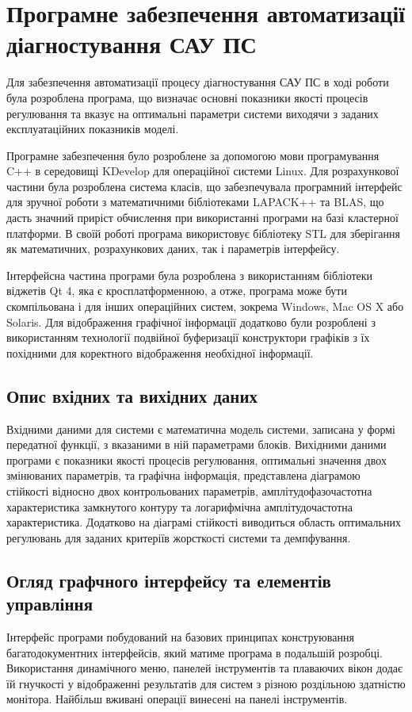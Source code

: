 \section{Програмне забезпечення автоматизації діагностування САУ ПС}

Для забезпечення автоматизації процесу діагностування САУ ПС в ході 
роботи була розроблена програма, що визначає основні показники якості 
процесів регулювання та вказує на оптимальні параметри системи виходячи 
з заданих експлуатаційних показників моделі. 

Програмне забезпечення було розроблене за допомогою мови програмування C++ в 
середовищі KDevelop для операційної системи Linux. Для розрахункової частини 
була розроблена система класів, що забезпечувала програмний інтерфейс для 
зручної роботи з математичними бібліотеками LAPACK++ та BLAS, що дасть 
значний приріст обчислення при використанні програми на базі кластерної 
платформи. В своїй роботі програма використовує бібліотеку STL для зберігання 
як математичних, розрахункових даних, так і параметрів інтерфейсу.

Інтерфейсна частина програми була розроблена з використанням бібліотеки 
віджетів Qt 4, яка є кросплатформенною, а отже, програма може бути 
скомпільована і для інших операційних систем, зокрема Windows, Mac OS X або 
Solaris. Для відображення графічної інформації додатково були розроблені з 
використанням технології подвійної буферизації конструктори графіків з їх 
похідними для коректного відображення необхідної інформації.


\subsection{Опис вхідних та вихідних даних}
Вхідними даними для системи є математична модель системи, записана у 
формі передатної функції, з вказаними в ній параметрами блоків. 
Вихідними даними програми є показники якості процесів регулювання, 
оптимальні значення двох змінюваних параметрів, та графічна інформація, 
представлена діаграмою стійкості відносно двох контрольованих параметрів, 
амплітудофазочастотна характеристика замкнутого контуру та логарифмічна 
амплітудочастотна характеристика. Додатково на діаграмі стійкості 
виводиться область оптимальних регулювань для заданих критеріїв жорсткості 
системи та демпфування.

\subsection{Огляд графчного інтерфейсу та елементів управління}
Інтерфейс програми побудований на базових принципах конструювання 
багатодокументних інтерфейсів, який матиме програма в подальшій розробці. 
Використання динамічного меню, панелей інструментів та плаваючих вікон додає 
їй гнучкості у відображенні результатів для систем з різною роздільною 
здатністю монітора. Найбільш вживані операції винесені на панелі інструментів.

